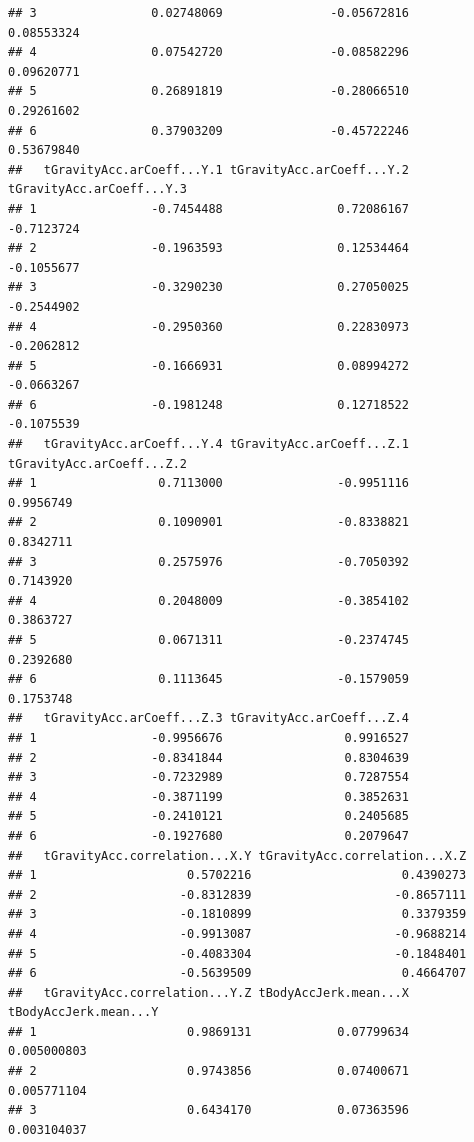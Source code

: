 \documentclass[
]{article}
\begin{document}
\begin{verbatim}
## 3                0.02748069               -0.05672816                0.08553324
## 4                0.07542720               -0.08582296                0.09620771
## 5                0.26891819               -0.28066510                0.29261602
## 6                0.37903209               -0.45722246                0.53679840
##   tGravityAcc.arCoeff...Y.1 tGravityAcc.arCoeff...Y.2 tGravityAcc.arCoeff...Y.3
## 1                -0.7454488                0.72086167                -0.7123724
## 2                -0.1963593                0.12534464                -0.1055677
## 3                -0.3290230                0.27050025                -0.2544902
## 4                -0.2950360                0.22830973                -0.2062812
## 5                -0.1666931                0.08994272                -0.0663267
## 6                -0.1981248                0.12718522                -0.1075539
##   tGravityAcc.arCoeff...Y.4 tGravityAcc.arCoeff...Z.1 tGravityAcc.arCoeff...Z.2
## 1                 0.7113000                -0.9951116                 0.9956749
## 2                 0.1090901                -0.8338821                 0.8342711
## 3                 0.2575976                -0.7050392                 0.7143920
## 4                 0.2048009                -0.3854102                 0.3863727
## 5                 0.0671311                -0.2374745                 0.2392680
## 6                 0.1113645                -0.1579059                 0.1753748
##   tGravityAcc.arCoeff...Z.3 tGravityAcc.arCoeff...Z.4
## 1                -0.9956676                 0.9916527
## 2                -0.8341844                 0.8304639
## 3                -0.7232989                 0.7287554
## 4                -0.3871199                 0.3852631
## 5                -0.2410121                 0.2405685
## 6                -0.1927680                 0.2079647
##   tGravityAcc.correlation...X.Y tGravityAcc.correlation...X.Z
## 1                     0.5702216                     0.4390273
## 2                    -0.8312839                    -0.8657111
## 3                    -0.1810899                     0.3379359
## 4                    -0.9913087                    -0.9688214
## 5                    -0.4083304                    -0.1848401
## 6                    -0.5639509                     0.4664707
##   tGravityAcc.correlation...Y.Z tBodyAccJerk.mean...X tBodyAccJerk.mean...Y
## 1                     0.9869131            0.07799634           0.005000803
## 2                     0.9743856            0.07400671           0.005771104
## 3                     0.6434170            0.07363596           0.003104037

\end{verbatim}
\end{document}
